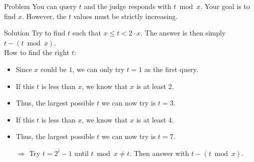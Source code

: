\begin{slide}
	\begin{block}{Problem}
		You can query $t$ and the judge responds with $t\bmod x$.
		Your goal is to find $x$.
		However, the $t$ values must be strictly increasing.
	\end{block}
	\pause
	\begin{block}{Solution}
		Try to find $t$ such that $x\leq t<2\cdot x$. The answer is then simply $t - (t\bmod x)$.\\
		\pause
		\smallskip
		How to find the right $t$:
		\begin{itemize}
			\item Since $x$ could be $1$, we can only try $t=1$ as the first query.
			\pause
			\item If this $t$ is less than $x$, we know that $x$ is at least $2$.
			\item Thus, the largest possible $t$ we can now try is $t=3$.
			\pause
			\item If this $t$ is less than $x$, we know that $x$ is at least $4$.
			\item Thus, the largest possible $t$ we can now try is $t=7$.
			\pause
			\item[$\Rightarrow$] Try $t=2^i-1$ until $t\bmod x\neq t$. Then answer with $t - (t\bmod x)$.
		\end{itemize}
	\end{block}
\end{slide}
